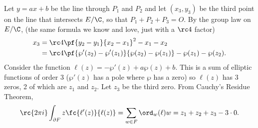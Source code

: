 Let $y=ax+b$ be the line through $P_1$ and $P_2$ and let $(x_3,y_3)$ be the third point on the line that intersects $E/\C$, so that $P_1+P_2+P_3=O$. By the group law on $E/\C$, (the same formula we know and love, just with a $\rc4$ factor)
\begin{align*}
x_3&=\rc 4\pf{y_2-y_1}{x_2-x_1}^2-x_1-x_2\\
&=\rc4 \pf{\wp'(z_2)-\wp'(z_1)}{\wp(z_2)-\wp(z_1)}-\wp(z_1)-\wp(z_2).
\end{align*}
Consider the function $\ell(z)=-\wp'(z)+a\wp(z)+b$. This is a sum of elliptic functions of order 3 ($\wp'(z)$ has a pole where $\wp$ has a zero) so $\ell(z)$ has 3 zeros, 2 of which are $z_1$ and $z_2$. Let $z_3$ be the third zero. From Cauchy's Residue Theorem,
\[
\rc{2\pi i}\int_{\partial F} z\fc{\ell'(z)}{\ell(z)}
=\sum_{w\in F} \ord_w(\ell)w=z_1+z_2+z_3-3\cdot 0.
\]
